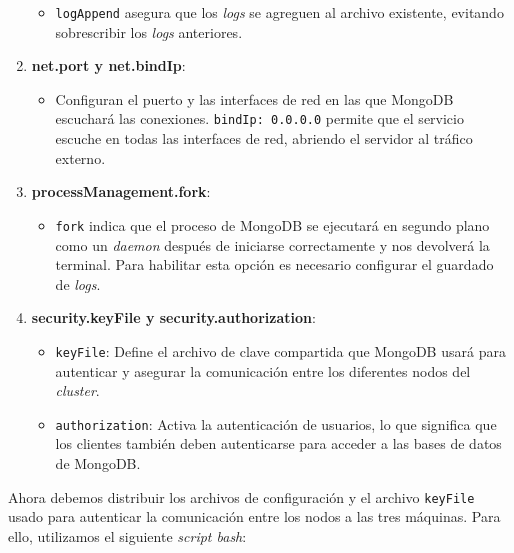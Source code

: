 \begin{enumerate}
\begin{itemize}
        \item \texttt{logAppend} asegura que los \textit{logs} se agreguen al archivo existente, evitando sobrescribir los \textit{logs} anteriores.
    \end{itemize}
    \item \textbf{net.port y net.bindIp}: 
    \begin{itemize}
        \item Configuran el puerto y las interfaces de red en las que MongoDB escuchará las conexiones. \texttt{bindIp: 0.0.0.0} permite que el servicio escuche en todas las interfaces de red, abriendo el servidor al tráfico externo.
    \end{itemize}
    \item \textbf{processManagement.fork}: 
    \begin{itemize}
        \item \texttt{fork} indica que el proceso de MongoDB se ejecutará en segundo plano como un \textit{daemon} después de iniciarse correctamente y nos devolverá la terminal. Para habilitar esta opción es necesario configurar el guardado de \textit{logs}.
    \end{itemize}
    \item \textbf{security.keyFile y security.authorization}: 
    \begin{itemize}
        \item \texttt{keyFile}: Define el archivo de clave compartida que MongoDB usará para autenticar y asegurar la comunicación entre los diferentes nodos del \textit{cluster}.
        \item \texttt{authorization}: Activa la autenticación de usuarios, lo que significa que los clientes también deben autenticarse para acceder a las bases de datos de MongoDB.
    \end{itemize}
\end{enumerate}

Ahora debemos distribuir los archivos de configuración y el archivo \texttt{keyFile} usado para autenticar la comunicación entre los nodos a las tres máquinas. Para ello, utilizamos el siguiente \textit{script bash}:

